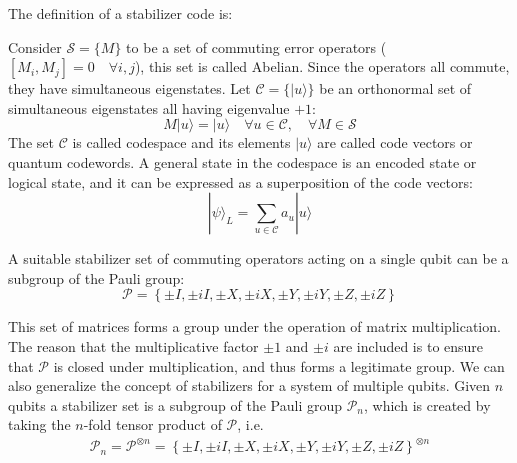 

The definition of a stabilizer code is: 

Consider $\mathcal{S}=\{M\}$ to be a set of commuting error operators ($[M_i,M_j]=0 \quad \forall i,j$), this set is called Abelian. Since the operators all commute, they  have simultaneous eigenstates.
Let $\mathcal{C}=\{|u\rangle\}$ be an orthonormal set of simultaneous eigenstates all having eigenvalue $+1$:
\begin{equation}
M|u\rangle=|u\rangle \quad \forall u \in \mathcal{C}, \quad \forall M \in \mathcal{S}
\label{eq:stab}
\end{equation}
The set $\mathcal{C}$ is called codespace and its elements $|u\rangle$ are called code vectors or quantum codewords. 
A general state in the codespace is an encoded state or logical state, and it can be expressed as a superposition of the code vectors:
$$
|\psi\rangle_{L}=\sum_{u \in \mathcal{C}} a_{u}|u\rangle
$$ 

A suitable stabilizer set of commuting operators acting on a single qubit can be a subgroup of the Pauli group:
$$
\mathcal{P}=\left\{\pm I, \pm i I, \pm X, \pm i X, \pm Y, \pm i Y, \pm Z, \pm i Z\right\}
$$

This set of matrices forms a group under the operation of matrix multiplication. The reason that the multiplicative factor $\pm 1 $ and $\pm i$ are included is to ensure that $\mathcal{P}$ is closed under multiplication, and thus forms a legitimate group. 
We can also generalize the concept of stabilizers for a system of multiple qubits. 
Given $n$ qubits a stabilizer set is a subgroup of the Pauli group $\mathcal{P}_n$, which is created by taking the $n$-fold tensor product of $\mathcal{P}$, i.e.
$$
\begin{aligned}
\mathcal{P}_{n} =\mathcal{P}^{\otimes n}
=\left\{\pm I, \pm i I, \pm X, \pm i X, \pm Y, \pm i Y, \pm Z, \pm i Z\right\}^{\otimes n}
\end{aligned}
$$


